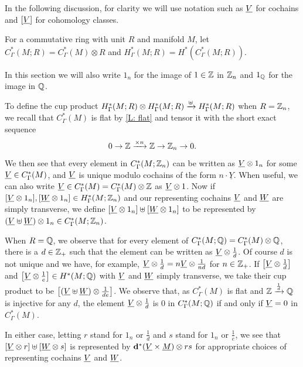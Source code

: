 In the following discussion, for clarity we will use notation such as $\underline{V}$ for cochains and $[\underline{V}]$ for cohomology classes.

\begin{definition}
	For a commutative ring with unit $R$ and manifold $M$, let $C^*_\Gamma(M;R) = C^*_\Gamma(M) \otimes R$ and $H^*_\Gamma(M;R) = H^*(C^*_\Gamma(M;R))$.
\end{definition}

In this section we will also write $1_n$ for the image of $1 \in \mathbb{Z}$ in $\mathbb{Z}_n$ and $1_{\mathbb{Q}}$ for the image in $\mathbb{Q}$.

To define the cup product $H^*_\Gamma(M;R) \otimes H^*_\Gamma(M;R) \xrightarrow{\uplus} H^*_\Gamma(M;R)$ when $R=\mathbb{Z}_n$, we recall that $C^*_\Gamma(M)$ is flat by \cref{L: flat} and tensor it with the short exact sequence $$0 \to \mathbb{Z} \xrightarrow{\times n} \mathbb{Z} \to \mathbb{Z}_n \to 0.$$
We then see that every element in $C^*_\Gamma(M;\mathbb{Z}_n)$ can be written as $\underline{V} \otimes 1_n$ for some $\underline{V} \in C^*_\Gamma(M)$, and $\underline{V}$ is unique modulo cochains of the form $n \cdot \underline{Y}$.
When useful, we can also write $\underline{V} \in C^*_\Gamma(M) = C^*_\Gamma(M)\otimes \mathbb{Z}$ as $\underline{V} \otimes 1$.
Now if $[\underline{V} \otimes 1_n], [\underline{W} \otimes 1_n] \in H^*_\Gamma(M;\mathbb{Z}_n)$ and our representing cochains $\underline{V}$ and $\underline{W}$ are simply transverse, we define $[\underline{V} \otimes 1_n] \uplus [\underline{W} \otimes 1_n]$ to be represented by $(\underline{V} \uplus \underline{W}) \otimes 1_n \in C^*_\Gamma(M;\mathbb{Z}_n)$.

When $R=\mathbb{Q}$, we observe that for every element of $C^*_\Gamma(M;\mathbb{Q}) = C^*_\Gamma(M) \otimes \mathbb{Q}$, there is a $d \in \mathbb{Z}_+$ such that the element can be written as $\underline{V} \otimes \frac{1}{d}$.
Of course $d$ is not unique and we have, for example, $\underline{V} \otimes \frac{1}{d} = n\underline{V} \otimes \frac{1}{nd}$ for $n \in \mathbb{Z}_+$.
If $\left[\underline{V} \otimes \frac{1}{d}
\right]$ and $\left[\underline{V} \otimes \frac{1}{e}
\right]\in H^*(M;\mathbb{Q})$ with $\underline{V}$ and $\underline{W}$ simply transverse, we take their cup product to be $\left[(\underline{V} \uplus \underline{W}) \otimes \frac{1}{de} \right]$.
We observe that, as $C^*_\Gamma(M)$ is flat and $\mathbb{Z} \xrightarrow{\frac{1}{d}} \mathbb{Q}$ is injective for any $d$, the element $\underline{V} \otimes \frac{1}{d}$ is $0$ in $C^*_\Gamma(M;\mathbb{Q})$ if and only if $\underline{V} = 0$ in $C^*_\Gamma(M)$.

In either case, letting $r$ stand for $1_n$ or $\frac{1}{d}$ and $s$ stand for $1_n$ or $\frac{1}{e}$, we see that $[\underline{V} \otimes r] \uplus [\underline{W} \otimes s]$ is represented by $\mathbf{d}^*(\underline{V} \times \underline{M}) \otimes rs$ for appropriate choices of representing cochains $\underline{V}$ and $\underline{W}$.

